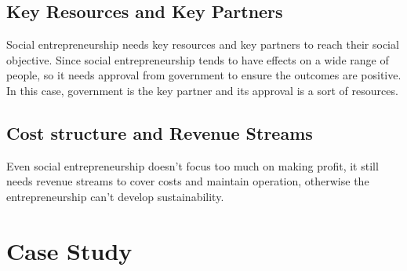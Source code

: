 \documentclass[12pt]{article}
\begin{document}
\subsection{Key Resources and Key Partners}
Social entrepreneurship needs key resources and key partners to reach their social objective. Since social entrepreneurship tends to have effects on a wide range of people, so it needs approval from government to ensure the outcomes are positive. In this case, government is the key partner and its approval is a sort of resources.
\subsection{Cost structure and Revenue Streams}
Even social entrepreneurship doesn't focus too much on making profit, it still needs revenue streams to cover costs and maintain operation, otherwise the entrepreneurship can't develop sustainability.
\section{Case Study}
\end{document}
